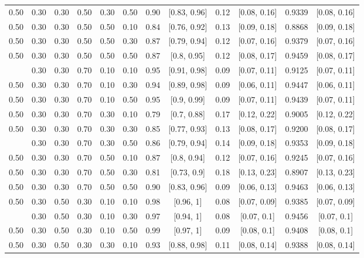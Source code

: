 \documentclass[
  11pt,
]{article}
\begin{document}
\begin{landscape}
\begin{ThreePartTable}
\begin{longtable}[t]{cccccccccccc}
0.50 & 0.30 & 0.30 & 0.50 & 0.30 & 0.50 & 0.90 & {}[0.83, 0.96] & 0.12 & {}[0.08, 0.16] & 0.9339 & {}[0.08, 0.16]\\
0.50 & 0.30 & 0.30 & 0.50 & 0.50 & 0.10 & 0.84 & {}[0.76, 0.92] & 0.13 & {}[0.09, 0.18] & 0.8868 & {}[0.09, 0.18]\\
0.50 & 0.30 & 0.30 & 0.50 & 0.50 & 0.30 & 0.87 & {}[0.79, 0.94] & 0.12 & {}[0.07, 0.16] & 0.9379 & {}[0.07, 0.16]\\
0.50 & 0.30 & 0.30 & 0.50 & 0.50 & 0.50 & 0.87 & {}[0.8, 0.95] & 0.12 & {}[0.08, 0.17] & 0.9459 & {}[0.08, 0.17]\\
\addlinespace
0.50 & 0.30 & 0.30 & 0.70 & 0.10 & 0.10 & 0.95 & {}[0.91, 0.98] & 0.09 & {}[0.07, 0.11] & 0.9125 & {}[0.07, 0.11]\\
0.50 & 0.30 & 0.30 & 0.70 & 0.10 & 0.30 & 0.94 & {}[0.89, 0.98] & 0.09 & {}[0.06, 0.11] & 0.9447 & {}[0.06, 0.11]\\
0.50 & 0.30 & 0.30 & 0.70 & 0.10 & 0.50 & 0.95 & {}[0.9, 0.99] & 0.09 & {}[0.07, 0.11] & 0.9439 & {}[0.07, 0.11]\\
0.50 & 0.30 & 0.30 & 0.70 & 0.30 & 0.10 & 0.79 & {}[0.7, 0.88] & 0.17 & {}[0.12, 0.22] & 0.9005 & {}[0.12, 0.22]\\
0.50 & 0.30 & 0.30 & 0.70 & 0.30 & 0.30 & 0.85 & {}[0.77, 0.93] & 0.13 & {}[0.08, 0.17] & 0.9200 & {}[0.08, 0.17]\\
\addlinespace
0.50 & 0.30 & 0.30 & 0.70 & 0.30 & 0.50 & 0.86 & {}[0.79, 0.94] & 0.14 & {}[0.09, 0.18] & 0.9353 & {}[0.09, 0.18]\\
0.50 & 0.30 & 0.30 & 0.70 & 0.50 & 0.10 & 0.87 & {}[0.8, 0.94] & 0.12 & {}[0.07, 0.16] & 0.9245 & {}[0.07, 0.16]\\
0.50 & 0.30 & 0.30 & 0.70 & 0.50 & 0.30 & 0.81 & {}[0.73, 0.9] & 0.18 & {}[0.13, 0.23] & 0.8907 & {}[0.13, 0.23]\\
0.50 & 0.30 & 0.30 & 0.70 & 0.50 & 0.50 & 0.90 & {}[0.83, 0.96] & 0.09 & {}[0.06, 0.13] & 0.9463 & {}[0.06, 0.13]\\
0.50 & 0.30 & 0.50 & 0.30 & 0.10 & 0.10 & 0.98 & {}[0.96, 1] & 0.08 & {}[0.07, 0.09] & 0.9385 & {}[0.07, 0.09]\\
\addlinespace
0.50 & 0.30 & 0.50 & 0.30 & 0.10 & 0.30 & 0.97 & {}[0.94, 1] & 0.08 & {}[0.07, 0.1] & 0.9456 & {}[0.07, 0.1]\\
0.50 & 0.30 & 0.50 & 0.30 & 0.10 & 0.50 & 0.99 & {}[0.97, 1] & 0.09 & {}[0.08, 0.1] & 0.9408 & {}[0.08, 0.1]\\
0.50 & 0.30 & 0.50 & 0.30 & 0.30 & 0.10 & 0.93 & {}[0.88, 0.98] & 0.11 & {}[0.08, 0.14] & 0.9388 & {}[0.08, 0.14]\\

\end{longtable}
\end{ThreePartTable}
\end{landscape}
\end{document}
